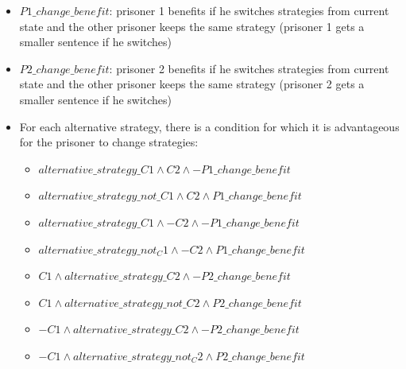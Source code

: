 \documentclass[a4paper,12pt]{report}
\begin{document}
\begin{itemize}
\item $P1\_change\_benefit$: prisoner 1 benefits if he switches strategies from current state and the other prisoner keeps the same strategy (prisoner 1 gets a smaller sentence if he switches)
\item $P2\_change\_benefit$: prisoner 2 benefits if he switches strategies from current state and the other prisoner keeps the same strategy (prisoner 2 gets a smaller sentence if he switches)
\end{itemize}

\begin{itemize}
\item For each alternative strategy, there is a condition for which it is advantageous for the prisoner to change strategies:
\begin{itemize}
\item $alternative\_strategy\_C1 \land C2 \land -P1\_change\_benefit$
\item $alternative\_strategy\_not\_C1 \land C2 \land P1\_change\_benefit$
\item $alternative\_strategy\_C1 \land -C2 \land -P1\_change\_benefit$
\item $alternative\_strategy\_not_C1 \land -C2 \land P1\_change\_benefit$
\item $C1 \land alternative\_strategy\_C2 \land -P2\_change\_benefit$
\item $C1 \land alternative\_strategy\_not\_C2 \land P2\_change\_benefit$
\item $-C1 \land alternative\_strategy\_C2 \land -P2\_change\_benefit$
\item $-C1 \land alternative\_strategy\_not_C2 \land P2\_change\_benefit$
\end{itemize}
\end{itemize}
\end{document}
